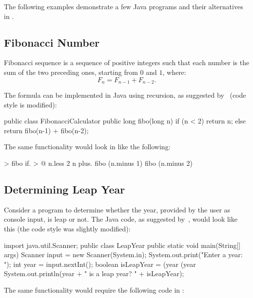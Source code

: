 The following examples demonstrate a few Java programs and their alternatives
in \eo{}.

\subsection{Fibonacci Number}

Fibonacci sequence is a sequence of positive integers such that
each number is the sum of the two preceding ones, starting from $0$ and $1$, where:
\begin{equation*}
F_n = F_{n-1} + F_{n-2}.
\end{equation*}

The formula can be implemented in Java using recursion, as suggested
by~\citet[p.743]{deitel2007java} (code style is modified):

\begin{ffcode}
public class FibonacciCalculator {
  public long fibo(long n) {
    if (n < 2) {
      return n;
    } else {
      return fibo(n-1) + fibo(n-2);
    }
  }
}
\end{ffcode}

The same functionality would look in \eo{} like the following:

\begin{ffcode}
[n] > fibo
  if. > @
    n.less 2
    n
    plus.
      fibo (n.minus 1)
      fibo (n.minus 2)
\end{ffcode}

\subsection{Determining Leap Year}

Consider a program to determine whether the year, provided
by the user as console input, is leap or not. The Java code,
as suggested by~\citet[pp.105--106]{liang2012}, would look like this
(the code style was slightly modified):

\begin{ffcode}
import java.util.Scanner;
public class LeapYear {
  public static void main(String[] args) {
    Scanner input = new Scanner(System.in);
    System.out.print("Enter a year: ");
    int year = input.nextInt();
    boolean isLeapYear =
      (year %
      (year %
    System.out.println(year +
      " is a leap year? " + isLeapYear);
  }
}
\end{ffcode}

The same functionality would require the following code in \eo{}:

